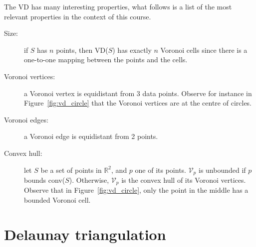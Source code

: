 %

The VD has many interesting properties, what follows is a list of the most relevant properties in the context of this course.
\begin{description}
  \item[Size:] if $S$ has $n$ points, then VD($S$) has exactly $n$ Voronoi cells since there is a one-to-one mapping between the points and the cells.
  \item[Voronoi vertices:] a Voronoi vertex is equidistant from 3 data points. Observe for instance in Figure~\ref{fig:vd_circle} that the Voronoi vertices are at the centre of circles.
  \item[Voronoi edges:] a Voronoi edge is equidistant from 2 points.
  \item[Convex hull:] let $S$ be a set of points in $\mathbb{R}^2$, and $p$ one of its points. $\mathcal{V}_{p}$ is unbounded if $p$ bounds conv($S$). Otherwise, $\mathcal{V}_{p}$ is the convex hull of its Voronoi vertices. Observe that in Figure~\ref{fig:vd_circle}, only the point in the middle has a bounded Voronoi cell.
\end{description}
  

%
\section{Delaunay triangulation}%
\label{sec:dt_definition}

